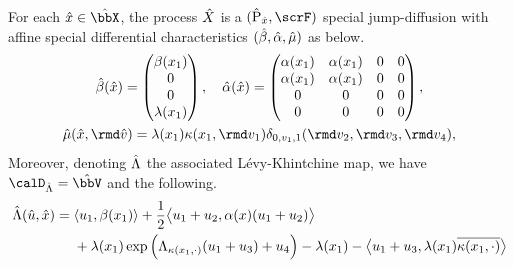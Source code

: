 \begin{proposition}
  \label{proposition:joint-characteristics}
  For each $\hat\stateVar \in \hat\stateSpace$, the process $\hat{X}$ is a $(\hat\Prb_{\hat\stateVar}, \scrF)$ special jump-diffusion with affine special differential characteristics $(\hat{\beta}, \hat{\alpha}, \hat{\mu})$ as below.
  \begin{equation}
    \label{eq:joint-characteristics}
    \begin{gathered}
      \hat\affDrift(\hat\stateVar) = \begin{pmatrix} \affDrift(\stateVar_1) \\ 0 \\ 0 \\ \affInt(\stateVar_1) \end{pmatrix}, \quad
      \hat\affDiff(\hat\stateVar) = \begin{pmatrix} \affDiff(\stateVar_1) & \affDiff(\stateVar_1) & 0 & 0 \\ \affDiff(\stateVar_1) & \affDiff(\stateVar_1) & 0 & 0 \\ 0 & 0 & 0 & 0 \\ 0 & 0 & 0 & 0 \end{pmatrix}, \\
      \hat\affJump(\hat\stateVar, \rmd\hat\markVar) = \affInt(\stateVar_1) \affDist(\stateVar_1, \rmd\markVar_1) \delta_{0,\markVar_1,1}(\rmd\markVar_2, \rmd\markVar_3, \rmd\markVar_4),
    \end{gathered}
  \end{equation}
  Moreover, denoting $\hat{\Lambda}$ the associated L\'evy-Khintchine map, we have $\odeSpaceJoint = \hat\vecSpace$ and the following.
  \begin{equation*}
    \hat{\Lambda}(\hat{u}, \hat{x}) = \begin{aligned}[t]
      &{\langle u_1 , \beta(x_1) \rangle} + \frac12{\big\langle u_1+u_2 , \alpha(x)(u_1+u_2) \big\rangle} \\
      &+ \lambda(x_1)\exp\Big(\Lambda_{\kappa(x_1,\cdot)}(u_1+u_3) + u_4\Big) - \lambda(x_1) -  {\big\langle u_1+u_3 , \lambda(x_1)\overline{\kappa(x_1,\cdot)} \big\rangle} 
    \end{aligned}
  \end{equation*}
\end{proposition}
